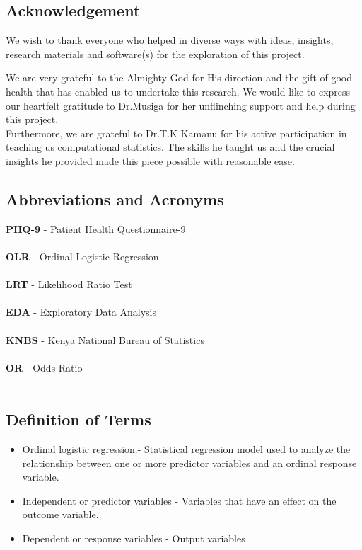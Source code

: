 \documentclass[12pt]{article}\usepackage[]{graphicx}\usepackage[]{xcolor}
\numberwithin{equation}{section}
\numberwithin{figure}{section}
\begin{document}
	\newpage
	
	\subsection*{Acknowledgement}
	We wish to thank everyone who helped in diverse ways with ideas, insights, research materials and software(s) for the exploration of this project.
	
	\noindent We are very grateful to the Almighty God for His direction and the gift of good health that has enabled us to undertake this research. We would like to express our heartfelt gratitude to Dr.Musiga for her unflinching support and help during this project.\\
	Furthermore, we are grateful to Dr.T.K Kamanu for his active participation in teaching us computational statistics. The skills he taught us and the crucial insights he provided made this piece possible with reasonable ease. 
	\newpage
	\tableofcontents
	\newpage
	\listoffigures
	\newpage
	\subsection*{Abbreviations and Acronyms}
	\textbf{PHQ-9} - Patient Health Questionnaire-9 \\\\
	\textbf{OLR} - Ordinal Logistic Regression\\\\
	\textbf{LRT} - Likelihood Ratio Test \\\\
	\textbf{EDA} - Exploratory Data Analysis \\\\
	\textbf{KNBS} - Kenya National Bureau of Statistics\\\\
	\textbf{OR} - Odds Ratio\\\\

	
	\newpage
	
	\subsection*{Definition of Terms}
	\begin{itemize}
		\item  Ordinal logistic regression.- Statistical regression model used to analyze the relationship between one or more predictor variables and an ordinal response variable. 
		\item Independent or predictor variables - Variables that have an effect on the outcome variable.
		\item Dependent or response variables - Output variables
		
		
	\end{itemize}
	
\end{document}
